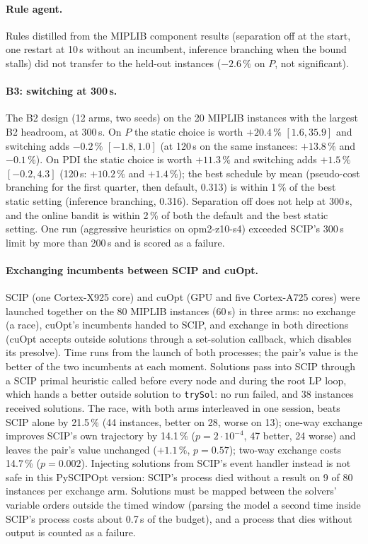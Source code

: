 \paragraph{Rule agent.} Rules distilled from the MIPLIB component results (separation off at the start, one restart
at 10\,s without an incumbent, inference branching when the bound stalls) did not transfer to the held-out
instances ($-2.6\,\%$ on $P$, not significant).

\paragraph{B3: switching at 300\,s.} The B2 design (12 arms, two seeds) on the 20 MIPLIB instances with the largest
B2 headroom, at 300\,s. On $P$ the static choice is worth $+20.4\,\%$ $[1.6, 35.9]$ and switching adds $-0.2\,\%$
$[-1.8, 1.0]$ (at 120\,s on the same instances: $+13.8\,\%$ and $-0.1\,\%$). On PDI the static choice is worth $+11.3\,\%$ and
switching adds $+1.5\,\%$ $[-0.2, 4.3]$ (120\,s: $+10.2\,\%$ and $+1.4\,\%$); the best schedule by mean (pseudo-cost
branching for the first quarter, then default, 0.313) is within 1\,\% of the best static setting (inference branching,
0.316). Separation off does not help at 300\,s, and the
online bandit is within 2\,\% of both the default and the best static setting. One run (aggressive heuristics on
opm2-z10-s4) exceeded SCIP's 300\,s limit by more than 200\,s and is scored as a failure.

\paragraph{Exchanging incumbents between SCIP and cuOpt.} SCIP (one Cortex-X925 core) and cuOpt (GPU and five
Cortex-A725 cores) were launched together on the 80 MIPLIB instances (60\,s) in three arms: no exchange (a race),
cuOpt's incumbents handed to SCIP, and exchange in both directions (cuOpt accepts outside solutions through a
set-solution callback, which disables its presolve). Time runs from the launch of both processes; the pair's value is
the better of the two incumbents at each moment. Solutions pass into SCIP through a SCIP primal
heuristic called before every node and during the root LP loop, which hands a better outside solution to
\texttt{trySol}: no run failed, and 38 instances received solutions. The race, with both arms interleaved in one session, beats SCIP alone by 21.5\,\% (44 instances, better on 28,
worse on 13); one-way exchange improves SCIP's own trajectory by 14.1\,\% ($p=2\cdot10^{-4}$, 47 better,
24 worse) and leaves the pair's value unchanged ($+1.1\,\%$, $p=0.57$); two-way exchange costs 14.7\,\% ($p=0.002$).
Injecting solutions from SCIP's event handler instead is not safe in this PySCIPOpt version: SCIP's process died
without a result on 9 of 80 instances per exchange arm. Solutions must be mapped between the solvers' variable orders
outside the timed window (parsing the model a second time inside SCIP's process costs about 0.7\,s of the budget), and a
process that dies without output is counted as a failure.

